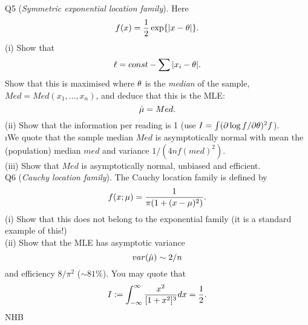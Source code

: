 \documentclass[12pt]{article}
\begin{document}
\ni Q5 ({\it Symmetric exponential location family}).  Here
$$
f(x) = \frac{1}{2} \exp \{ |x - \theta | \}.
$$
(i) Show that
$$
\ell = const - \sum |x_i - \theta|.
$$
Show that this is maximised where $\theta$ is the {\it median} of the sample, $Med = Med(x_1, \ldots, x_n)$, and deduce that this is the MLE:
$$
\hat{\mu} = Med.
$$
(ii) Show that the information per reading is 1 (use $I = \int (\partial \log f/\partial \theta)^2 f$). \\
\i We quote that the sample median $Med$ is asymptotically normal with mean the (population) median $med$ and variance $1/(4 n f(med)^2)$. \\
(iii) Show that $Med$ is asymptotically normal, unbiased and efficient. \\

\ni Q6 ({\it Cauchy location family}).  The Cauchy location family is defined by
$$
f(x; \mu) = \frac{1}{\pi(1 + (x - \mu)^2)}.
$$
(i) Show that this does not belong to the exponential family (it is a standard example of this!) \\
(ii) Show that the MLE has asymptotic variance
$$
var(\hat{\mu}) \sim 2/n
$$
and efficiency $8/{\pi}^2$ ($\sim 81\%$).
You may quote that
$$
I := \int_{-\infty}^{\infty} \frac{x^2}{[1 + x^2]^3} dx = \frac{1}{2}.
$$
\hfil NHB \break
\end{document}
